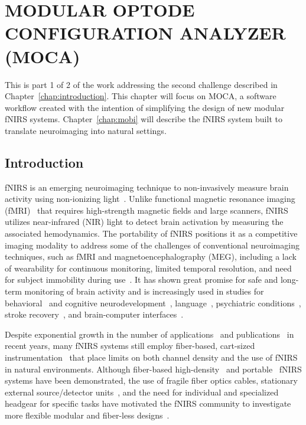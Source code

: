 
\chapter{MODULAR OPTODE CONFIGURATION ANALYZER (MOCA)} %
\label{chap:moca}
This is part 1 of 2 of the work addressing the second challenge described in Chapter~\ref{chap:introduction}. This chapter will focus on \ac{MOCA}, a software workflow created with the intention of simplifying the design of new modular \ac{fNIRS} systems. Chapter~\ref{chap:mobi} will describe the \ac{fNIRS} system built to translate neuroimaging into natural settings. 

\section{Introduction}
\label{sec:introduction}
\ac{fNIRS} is an emerging neuroimaging technique to non-invasively measure brain activity using non-ionizing light~\cite{Ferrari2012}. Unlike functional magnetic resonance imaging (fMRI)~\cite{Heinzel2013} that requires high-strength magnetic fields and large scanners, \ac{fNIRS} utilizes near-infrared (NIR) light to detect brain activation by measuring the associated hemodynamics. The portability of \ac{fNIRS} positions it as a competitive imaging modality to address some of the challenges of conventional neuroimaging techniques, such as fMRI and magnetoencephalography (MEG), including a lack of wearability for continuous monitoring, limited temporal resolution, and need for subject immobility during use~\cite{Yucel2017}. It has shown great promise for safe and long-term monitoring of brain activity and is increasingly used in studies for behavioral~\cite{McDonald2018} and cognitive neurodevelopment~\cite{Aslin2015, Vanderwert2014, Wilcox2015, Soltanlou2018}, language~\cite{Quaresima2012, Rossi2012}, psychiatric conditions~\cite{Ehlis2014, Kumar2017}, stroke recovery~\cite{Yang2019}, and brain-computer interfaces~\cite{Naseer2015, Ahn2017, Hong2018}. 

Despite exponential growth in the number of applications~\cite{Boas2014, Quaresima2019} and publications~\cite{Yucel2017} in recent years, many \ac{fNIRS} systems still employ fiber-based, cart-sized instrumentation~\cite{Scholkmann2014} that place limits on both channel density and the use of \ac{fNIRS} in natural environments. Although fiber-based high-density~\cite{Eggebrecht2014} and portable~\cite{Wheelock2019} \ac{fNIRS} systems have been demonstrated, the use of fragile fiber optics cables, stationary external source/detector units~\cite{Oxymon2017, Techen2018}, and the need for individual and specialized headgear for specific tasks have motivated the \ac{fNIRS} community to investigate more flexible modular and fiber-less designs~\cite{Zhao2017, Curtin2018}.

